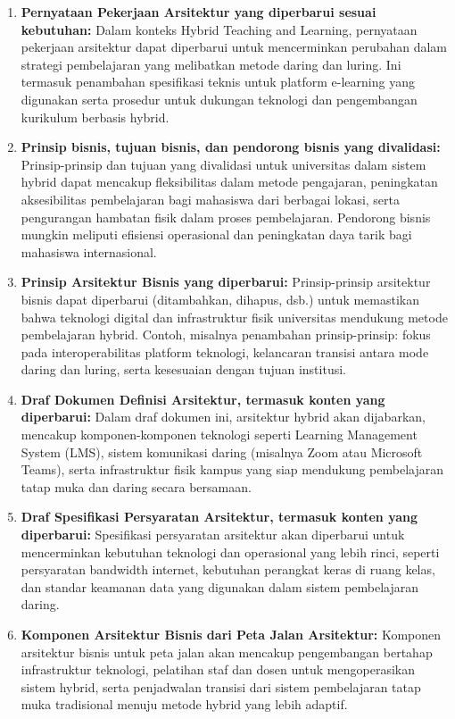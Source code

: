 \begin{enumerate}
	\item \textbf{Pernyataan Pekerjaan Arsitektur yang diperbarui sesuai kebutuhan:}  
	Dalam konteks Hybrid Teaching and Learning, pernyataan pekerjaan arsitektur dapat diperbarui untuk mencerminkan perubahan dalam strategi pembelajaran yang melibatkan metode daring dan luring. Ini termasuk penambahan spesifikasi teknis untuk platform e-learning yang digunakan serta prosedur untuk dukungan teknologi dan pengembangan kurikulum berbasis hybrid.
	
	\item \textbf{Prinsip bisnis, tujuan bisnis, dan pendorong bisnis yang divalidasi:}  
	Prinsip-prinsip dan tujuan yang divalidasi untuk universitas dalam sistem hybrid dapat mencakup fleksibilitas dalam metode pengajaran, peningkatan aksesibilitas pembelajaran bagi mahasiswa dari berbagai lokasi, serta pengurangan hambatan fisik dalam proses pembelajaran. Pendorong bisnis mungkin meliputi efisiensi operasional dan peningkatan daya tarik bagi mahasiswa internasional.
	
	\item \textbf{Prinsip Arsitektur Bisnis yang diperbarui:}  
	Prinsip-prinsip arsitektur bisnis dapat diperbarui (ditambahkan, dihapus, dsb.) untuk memastikan bahwa teknologi digital dan infrastruktur fisik universitas mendukung metode pembelajaran hybrid. Contoh, misalnya penambahan prinsip-prinsip: fokus pada interoperabilitas platform teknologi, kelancaran transisi antara mode daring dan luring, serta kesesuaian dengan tujuan institusi.
	
	\item \textbf{Draf Dokumen Definisi Arsitektur, termasuk konten yang diperbarui:}  
	Dalam draf dokumen ini, arsitektur hybrid akan dijabarkan, mencakup komponen-komponen teknologi seperti Learning Management System (LMS), sistem komunikasi daring (misalnya Zoom atau Microsoft Teams), serta infrastruktur fisik kampus yang siap mendukung pembelajaran tatap muka dan daring secara bersamaan.
	
	\item \textbf{Draf Spesifikasi Persyaratan Arsitektur, termasuk konten yang diperbarui:}  
	Spesifikasi persyaratan arsitektur akan diperbarui untuk mencerminkan kebutuhan teknologi dan operasional yang lebih rinci, seperti persyaratan bandwidth internet, kebutuhan perangkat keras di ruang kelas, dan standar keamanan data yang digunakan dalam sistem pembelajaran daring.
	
	\item \textbf{Komponen Arsitektur Bisnis dari Peta Jalan Arsitektur:}  
	Komponen arsitektur bisnis untuk peta jalan akan mencakup pengembangan bertahap infrastruktur teknologi, pelatihan staf dan dosen untuk mengoperasikan sistem hybrid, serta penjadwalan transisi dari sistem pembelajaran tatap muka tradisional menuju metode hybrid yang lebih adaptif.
\end{enumerate}

